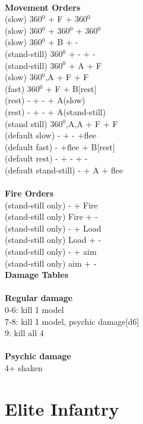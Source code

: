 \ \\ {\bf Movement Orders } \\
(slow) 360$^0$ + F + 360$^0$ \\
(slow) 360$^0$ + 360$^0$ + 360$^0$ \\
(slow) 360$^0$ + B + - \\
(stand-still) 360$^0$ + - + - \\
(stand-still) 360$^0$ + A + F \\
(slow) 360$^0$,A + F + F \\
(fast) 360$^0$ + F + B[rest] \\
(rest) - + - + A(slow) \\
(rest) - + - + A(stand-still) \\
(stand still) 360$^0$,A,A + F + F \\
(default slow) - + - +flee \\
(default fast) - +flee + B[rest] \\
(default rest) - + - + - \\
(default stand-still) - + A + flee \\
\ \\ {\bf Fire Orders } \\
(stand-still only) - + Fire \\
(stand-still only) Fire + -  \\
(stand-still only) - + Load \\
(stand-still only) Load + - \\
(stand-still only) - + aim \\
(stand-still only) aim + -  \\



{\bf Damage Tables} \\
\ \\ {\bf Regular damage } \\
0-6: kill 1 model \\
7-8: kill 1 model, psychic damage[d6] \\
9: kill all 4 \\
\ \\ {\bf Psychic damage } \\
4+ shaken \\









\pagebreak

\section{ Elite Infantry }

